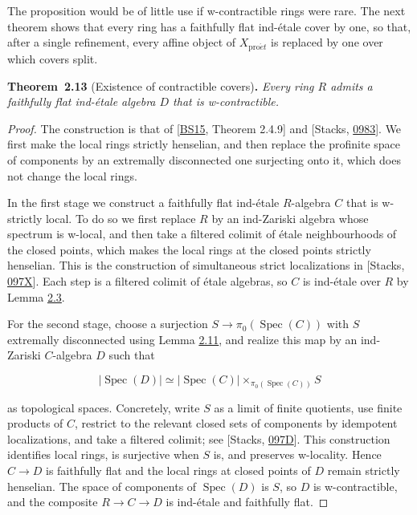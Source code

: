 \documentclass[11pt]{article}
\newenvironment{bpstatement}[2]{\par\addvspace{0.6\baselineskip}\noindent\textbf{#1}#2\textbf{.}\enspace\ignorespaces}
  {\par\addvspace{0.4\baselineskip}}
\newenvironment{bpstatementit}[2]{\begin{bpstatement}{#1}{#2}\itshape\ignorespaces}{\end{bpstatement}}
\begin{document}
\label{bp36}%
The proposition would be of little use if w-contractible rings were rare. The next theorem shows that every ring has a faithfully flat ind-étale cover by one, so that, after a single refinement, every affine object of \(X_{\mathrm{pro}\acute{e}t}\) is replaced by one over which covers split.

\label{bp37}%
\begin{bpstatementit}{Theorem~2.13}{ (Existence of contractible covers)}
Every ring \(R\) admits a faithfully flat ind-étale algebra \(D\) that is w-contractible.
\end{bpstatementit}

\begin{proof}[{Proof}]\label{bp38}%
The construction is that of [\hyperref[bp191]{BS15}, Theorem 2.4.9] and [Stacks, \href{https://stacks.math.columbia.edu/tag/0983}{0983}]. We first make the local rings strictly henselian, and then replace the profinite space of components by an extremally disconnected one surjecting onto it, which does not change the local rings.

In the first stage we construct a faithfully flat ind-étale \(R\)-algebra \(C\) that is w-strictly local. To do so we first replace \(R\) by an ind-Zariski algebra whose spectrum is w-local, and then take a filtered colimit of étale neighbourhoods of the closed points, which makes the local rings at the closed points strictly henselian. This is the construction of simultaneous strict localizations in [Stacks, \href{https://stacks.math.columbia.edu/tag/097X}{097X}]. Each step is a filtered colimit of étale algebras, so \(C\) is ind-étale over \(R\) by Lemma \hyperref[bp10]{2.3}.

For the second stage, choose a surjection \(S\to\pi_0(\operatorname{Spec}(C))\) with \(S\) extremally disconnected using Lemma \hyperref[bp31]{2.11}, and realize this map by an ind-Zariski \(C\)-algebra \(D\) such that

\[
|\operatorname{Spec}(D)|
\simeq |\operatorname{Spec}(C)|
\times_{\pi_0(\operatorname{Spec}(C))}S
\]

as topological spaces. Concretely, write \(S\) as a limit of finite quotients, use finite products of \(C\), restrict to the relevant closed sets of components by idempotent localizations, and take a filtered colimit; see [Stacks, \href{https://stacks.math.columbia.edu/tag/097D}{097D}]. This construction identifies local rings, is surjective when \(S\) is, and preserves w-locality. Hence \(C\to D\) is faithfully flat and the local rings at closed points of \(D\) remain strictly henselian. The space of components of \(\operatorname{Spec}(D)\) is \(S\), so \(D\) is w-contractible, and the composite \(R\to C\to D\) is ind-étale and faithfully flat.
\end{proof}
\end{document}
